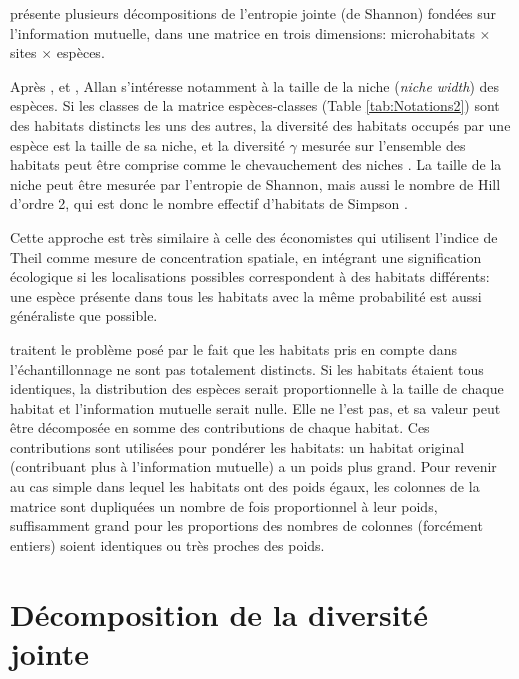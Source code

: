 \documentclass[
  11pt,
  french,
  a4paper,
  extrafontsizes,onecolumn,openright
  ]{memoir}
\begin{document}
\textcite{Allan1975} présente plusieurs décompositions de l'entropie jointe (de Shannon) fondées sur l'information mutuelle, dans une matrice en trois dimensions: microhabitats \(\times\) sites \(\times\) espèces.

Après \textcite{Levins1968}, \textcite{Colwell1971} et \textcite{Pielou1972}, Allan s'intéresse notamment à la taille de la niche (\emph{niche width}) des espèces.
Si les classes de la matrice espèces-classes (Table \ref{tab:Notations2}) sont des habitats distincts les uns des autres, la diversité des habitats occupés par une espèce est la taille de sa niche, et la diversité \(\gamma\) mesurée sur l'ensemble des habitats peut être comprise comme le chevauchement des niches \autocite{Pielou1972}.
La taille de la niche peut être mesurée par l'entropie de Shannon, mais aussi le nombre de Hill d'ordre 2, qui est donc le nombre effectif d'habitats de Simpson \autocite{Levins1968}.

Cette approche est très similaire à celle des économistes qui utilisent l'indice de Theil comme mesure de concentration spatiale, en intégrant une signification écologique si les localisations possibles correspondent à des habitats différents: une espèce présente dans tous les habitats avec la même probabilité est aussi généraliste que possible.

\textcite{Colwell1971} traitent le problème posé par le fait que les habitats pris en compte dans l'échantillonnage ne sont pas totalement distincts.
Si les habitats étaient tous identiques, la distribution des espèces serait proportionnelle à la taille de chaque habitat et l'information mutuelle serait nulle.
Elle ne l'est pas, et sa valeur peut être décomposée en somme des contributions de chaque habitat.
Ces contributions sont utilisées pour pondérer les habitats: un habitat original (contribuant plus à l'information mutuelle) a un poids plus grand.
Pour revenir au cas simple dans lequel les habitats ont des poids égaux, les colonnes de la matrice sont dupliquées un nombre de fois proportionnel à leur poids, suffisamment grand pour les proportions des nombres de colonnes (forcément entiers) soient identiques ou très proches des poids.

\hypertarget{chap-DiversiteJointe}{%
\chapter{Décomposition de la diversité jointe}\label{chap-DiversiteJointe}}

\scriptsize
\end{document}
